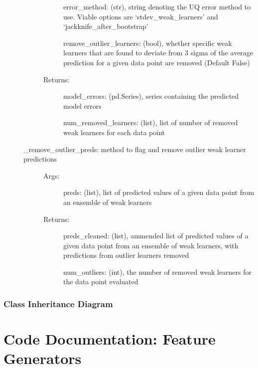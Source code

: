 \documentclass[letterpaper,10pt,english]{sphinxmanual}
\begin{document}
\begin{fulllineitems}
\begin{description}
\begin{description}
\begin{description}
error\_method: (str), string denoting the UQ error method to use. Viable options are ‘stdev\_weak\_learners’ and ‘jackknife\_after\_bootstrap’

remove\_outlier\_learners: (bool), whether specific weak learners that are found to deviate from 3 sigma of the average prediction for a given data point are removed (Default False)

\item[{Returns:}] \leavevmode
model\_errors: (pd.Series), series containing the predicted model errors

num\_removed\_learners: (list), list of number of removed weak learners for each data point

\end{description}

\item[{\_remove\_outlier\_preds: method to flag and remove outlier weak learner predictions}] \leavevmode\begin{description}
\item[{Args:}] \leavevmode
preds: (list), list of predicted values of a given data point from an ensemble of weak learners

\item[{Returns:}] \leavevmode
preds\_cleaned: (list), ammended list of predicted values of a given data point from an ensemble of weak learners, with predictions from outlier learners removed

num\_outliers: (int), the number of removed weak learners for the data point evaluated

\end{description}

\end{description}

\end{description}

\end{fulllineitems}



\subsection{Class Inheritance Diagram}
\label{\detokenize{4_error_analysis:class-inheritance-diagram}}


\chapter{Code Documentation: Feature Generators}
\label{\detokenize{5_feature_generators:code-documentation-feature-generators}}\label{\detokenize{5_feature_generators::doc}}
\end{document}
